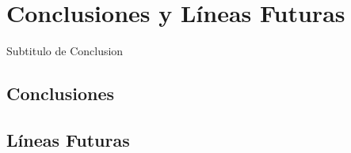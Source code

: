 \chapter{Conclusiones y Líneas Futuras}
    Subtitulo de Conclusion
    \section{Conclusiones}
        \lipsum[9-12]
 
    \section{Líneas Futuras}
        \lipsum[9-12]

    


